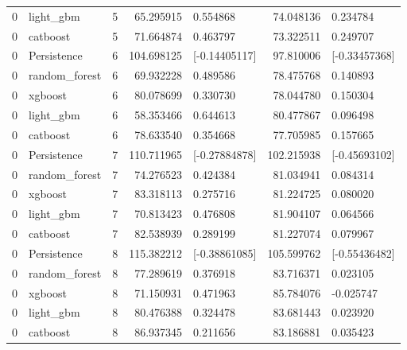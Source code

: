 \begin{tabular}{llrrlrl}
0 & light_gbm & 5 & 65.295915 & 0.554868 & 74.048136 & 0.234784 \\
0 & catboost & 5 & 71.664874 & 0.463797 & 73.322511 & 0.249707 \\
0 & Persistence & 6 & 104.698125 & [-0.14405117] & 97.810006 & [-0.33457368] \\
0 & random_forest & 6 & 69.932228 & 0.489586 & 78.475768 & 0.140893 \\
0 & xgboost & 6 & 80.078699 & 0.330730 & 78.044780 & 0.150304 \\
0 & light_gbm & 6 & 58.353466 & 0.644613 & 80.477867 & 0.096498 \\
0 & catboost & 6 & 78.633540 & 0.354668 & 77.705985 & 0.157665 \\
0 & Persistence & 7 & 110.711965 & [-0.27884878] & 102.215938 & [-0.45693102] \\
0 & random_forest & 7 & 74.276523 & 0.424384 & 81.034941 & 0.084314 \\
0 & xgboost & 7 & 83.318113 & 0.275716 & 81.224725 & 0.080020 \\
0 & light_gbm & 7 & 70.813423 & 0.476808 & 81.904107 & 0.064566 \\
0 & catboost & 7 & 82.538939 & 0.289199 & 81.227074 & 0.079967 \\
0 & Persistence & 8 & 115.382212 & [-0.38861085] & 105.599762 & [-0.55436482] \\
0 & random_forest & 8 & 77.289619 & 0.376918 & 83.716371 & 0.023105 \\
0 & xgboost & 8 & 71.150931 & 0.471963 & 85.784076 & -0.025747 \\
0 & light_gbm & 8 & 80.476388 & 0.324478 & 83.681443 & 0.023920 \\
0 & catboost & 8 & 86.937345 & 0.211656 & 83.186881 & 0.035423 \\
\end{tabular}
